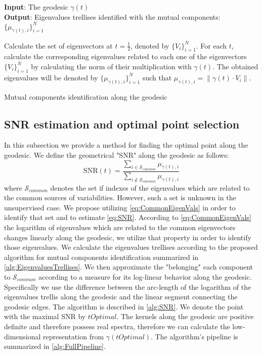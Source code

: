 \documentclass[]{article}
\theoremstyle{definition}
\begin{document}
	\begin{algorithm}
		\hspace*{\algorithmicindent} \textbf{Input}: The geodesic $\gamma(t)$ \\
		\hspace*{\algorithmicindent} \textbf{Output}: Eigenvalues trellises identified with the mutual components:$\{ \mu_{\gamma(t),i} \}_{i=1}^N$ 
		\begin{algorithmic}[1]
			\State Calculate the set of eigenvectors at $t=\frac{1}{2}$, denoted by $\{V_i\}_{i=1}^N$.
			\State For each $t$, calculate the corresponding eigenvalues related to each one of the eigenvectors $\{V_i\}_{i=1}^N$ by calculating the norm of their multiplication with $\gamma(t)$. The obtained eigenvalues will be denoted by $\{ \mu_{\gamma(t),i} \}_{i=1}^N$ such that $\mu_{\gamma(t),i}= \|\gamma(t)\cdot V_i \|$. 
		\end{algorithmic}
		\caption{Mutual components identification along the geodesic}
		\label{alg:EigenvaluesTrellises}
	\end{algorithm}	
	 	
	\subsection{SNR estimation and optimal point selection}
	In this subsection we provide a method for finding the optimal point along the geodesic. We define the geometrical "SNR" along the geodesic as follows:
	\begin{equation}
	\label{eq:SNR}
	\text{SNR}(t)=\frac{ \sum\limits_{i \in \mathcal{S}_{common}}{\mu_{\gamma(t),i}} }{\sum\limits_{i \notin \mathcal{S}_{common}}{\mu_{\gamma(t),i}}}
	\end{equation}
	where $\mathcal{S}_{common}$ denotes the set if indexes of the eigenvalues which are related to the common sources of variabilities.  
	However, such a set is unknown in the unsupervised case. We propose utilizing \ref{eq:CommonEigenVals} in order to identify that set and to estimate \ref{eq:SNR}.	According to \ref{eq:CommonEigenVals} the logarithm of eigenvalues which are related to the common eigenvectors changes linearly along the geodesic, we utilize that property in order to identify those eigenvalues. We calculate the eigenvalues trellises according to the proposed algorithm for mutual components identification summarized in \ref{alg:EigenvaluesTrellises}. We then approximate the "belonging" each component to $\mathcal{S}_{common}$ according to a measure for its log-linear behavior along the geodesic. Specifically we use the difference between the arc-length of the logarithm of the eigenvalues trellis along the geodesic and the linear segment connecting the geodesic edges. The algorithm is described in \ref{alg:SNR}.
	We denote the point with the maximal SNR by $tOptimal$. The kernels along the geodesic are positive definite and therefore possess real spectra, therefore we can calculate the low-dimensional representation from $\gamma(tOptimal)$. The algorithm's pipeline is summarized in \ref{alg:FullPipeline}.
		
\end{document}
